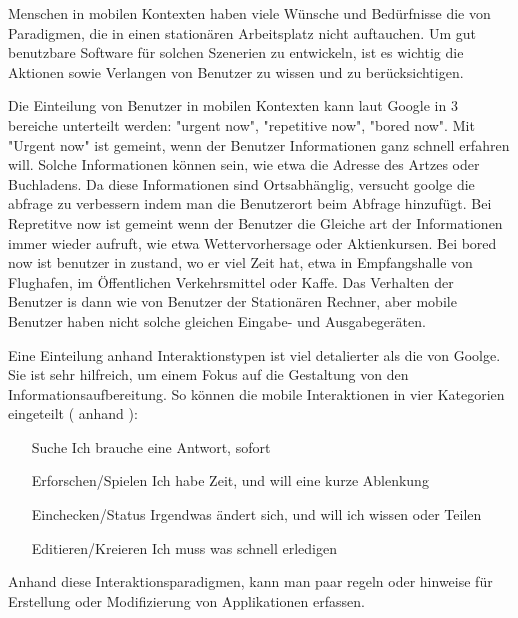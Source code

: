 
Menschen in mobilen Kontexten haben viele Wünsche und Bedürfnisse die von Paradigmen, die in einen stationären Arbeitsplatz nicht auftauchen. Um gut benutzbare Software für solchen Szenerien zu entwickeln, ist es wichtig die Aktionen sowie Verlangen von Benutzer zu wissen und zu berücksichtigen. 

Die Einteilung von Benutzer in mobilen Kontexten kann laut Google in 3 bereiche unterteilt werden: "urgent now", "repetitive now", "bored now"\cite{googleUsers}. Mit "Urgent now" ist gemeint, wenn der Benutzer Informationen ganz schnell erfahren will. Solche Informationen können sein, wie etwa die Adresse des Artzes oder Buchladens. Da diese Informationen sind Ortsabhänglig, versucht goolge die abfrage zu verbessern indem man die Benutzerort beim Abfrage hinzufügt. Bei Repretitve now ist gemeint wenn der Benutzer die Gleiche art der Informationen immer wieder aufruft, wie etwa Wettervorhersage oder Aktienkursen. Bei bored now ist benutzer in zustand, wo er viel Zeit hat, etwa in Empfangshalle von Flughafen, im Öffentlichen Verkehrsmittel  oder Kaffe. Das Verhalten der Benutzer is dann wie von Benutzer der Stationären Rechner, aber mobile Benutzer haben nicht solche gleichen Eingabe- und Ausgabegeräten.

Eine Einteilung anhand  Interaktionstypen ist viel detalierter als die von Goolge. Sie ist sehr hilfreich, um einem Fokus auf die Gestaltung von den Informationsaufbereitung. So können die mobile Interaktionen in vier Kategorien eingeteilt ( anhand \cite[Seite 50]{mobileFirst}):

\begin{itemize}
 	\item[Suche] Ich brauche eine Antwort, sofort
 	\item[Erforschen/Spielen] Ich habe Zeit, und will eine kurze Ablenkung
 	\item[Einchecken/Status] Irgendwas ändert sich, und will ich wissen oder Teilen
 	\item[Editieren/Kreieren] Ich muss was schnell erledigen
 \end{itemize} 

Anhand diese Interaktionsparadigmen, kann man paar regeln oder hinweise für Erstellung oder Modifizierung von Applikationen erfassen.

